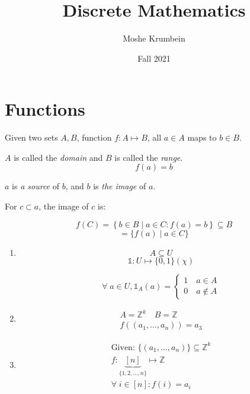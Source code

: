 \documentclass[00_complete]{subfiles}
\title{Discrete Mathematics}
\author{Moshe Krumbein}
\date{Fall 2021}
\begin{document}

\section{Functions}

Given two sets $A, B$, function $f: A \mapsto B$, all $a \in A$ maps to $b \in B$.

$A$ is called the \emph{domain} and $B$ is called the \emph{range}.
$$f(a)=b$$

$a$ is \emph{a source} of $b$, and $b$ is \emph{the image} of $a$.

For $c \subset a$, the image of $c$ is:

$$f(C) = \left\{b \in B \mid a \in C : f(a) = b \right\} \subseteq B$$
$$=\{f(a) \mid a \in C\}$$

\begin{example}
\begin{enumerate}
Given $f: A \mapsto B$:

$$\Im f = f(A) \subseteq B$$

Given $D \subseteq B$, the source of $D$:

$$ f^{-1}(D) = \{a \in A \mid f(a) \in D\}$$

\item
$$A \subseteq U$$
$$\mathds{1}: U \mapsto \{0,1\} (\chi)$$

$$\forall \; a \in U, \mathds{1}_A(a) = \begin{cases}
    1 \quad a \in A \\
    0 \quad a \notin A
\end{cases}$$

\item
$$
\begin{gathered}
    A = \mathbb{Z}^k \quad B = \mathbb{Z} \\
    f((a_1, \ldots, a_n)) = a_3
\end{gathered}
$$

\item
$$
\begin{gathered}
    \text{Given: }\{(a_1, \ldots, a_n)\} \subseteq \mathbb{Z}^k \\
    f: \underbrace{[n]}_{\{1,2,\ldots,n\}} \mapsto \mathbb{Z} \\
    \forall \; i \in [n] : f(i)= a_i
\end{gathered}
$$

\end{enumerate}
\end{example}
\end{document}
